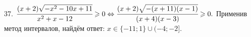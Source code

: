 37. $\cfrac{(x+2)\sqrt{-x^2-10x+11}}{x^2+x-12}\geqslant0\Leftrightarrow\cfrac{(x+2)\sqrt{-(x+11)(x-1)}}{(x+4)(x-3)}\geqslant0.$ Применив метод интервалов, найдём ответ: $x\in\{-11;1\}\cup(-4;-2].$
\begin{figure}[ht!]
\end{figure}\\

